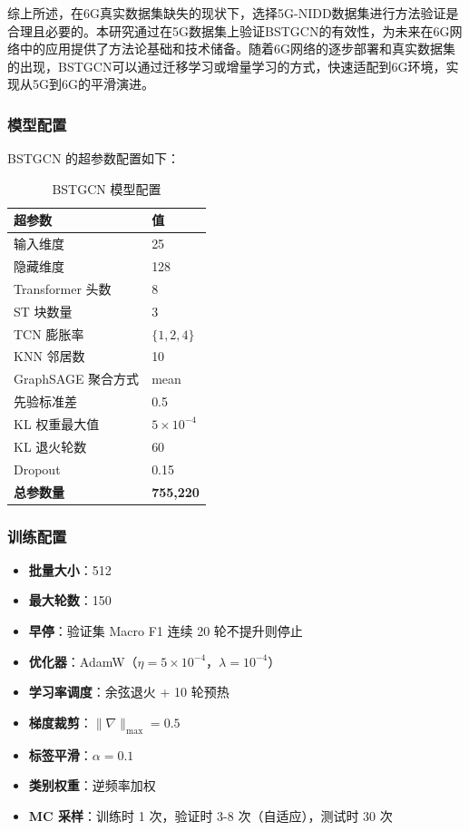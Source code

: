 综上所述，在6G真实数据集缺失的现状下，选择5G-NIDD数据集进行方法验证是合理且必要的。本研究通过在5G数据集上验证BSTGCN的有效性，为未来在6G网络中的应用提供了方法论基础和技术储备。随着6G网络的逐步部署和真实数据集的出现，BSTGCN可以通过迁移学习或增量学习的方式，快速适配到6G环境，实现从5G到6G的平滑演进。

\subsubsection{模型配置}

BSTGCN 的超参数配置如下：

\begin{table}[h]
\centering
\begin{tabular}{ll}
\hline
\textbf{超参数} & \textbf{值} \\
\hline
输入维度 & 25 \\
隐藏维度 & 128 \\
Transformer 头数 & 8 \\
ST 块数量 & 3 \\
TCN 膨胀率 & $\{1, 2, 4\}$ \\
KNN 邻居数 & 10 \\
GraphSAGE 聚合方式 & mean \\
先验标准差 & 0.5 \\
KL 权重最大值 & $5\times10^{-4}$ \\
KL 退火轮数 & 60 \\
Dropout & 0.15 \\
\hline
\textbf{总参数量} & \textbf{755,220} \\
\hline
\end{tabular}
\caption{BSTGCN 模型配置}
\end{table}

\subsubsection{训练配置}

\begin{itemize}
  \item \textbf{批量大小}：512
  \item \textbf{最大轮数}：150
  \item \textbf{早停}：验证集 Macro F1 连续 20 轮不提升则停止
  \item \textbf{优化器}：AdamW（$\eta=5\times10^{-4}$，$\lambda=10^{-4}$）
  \item \textbf{学习率调度}：余弦退火 + 10 轮预热
  \item \textbf{梯度裁剪}：$\|\nabla\|_{\max}=0.5$
  \item \textbf{标签平滑}：$\alpha=0.1$
  \item \textbf{类别权重}：逆频率加权
  \item \textbf{MC 采样}：训练时 1 次，验证时 3-8 次（自适应），测试时 30 次
\end{itemize}


